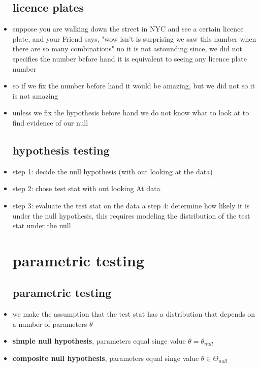 \documentclass{article}
\begin{document}
\begin{itemize}
\subsection{licence plates}
\item suppose you are walking down the street in NYC and see a certain licence plate, and your Friend says, "wow isn't is surprising we saw this number when there are so many combinations" no it is not astounding since, we did not specifies the number before hand it is equivalent to seeing any licence plate number
\item so if we fix the number before hand it would be amazing, but we did not so it is not amazing 
\item unless we fix the hypothesis before hand we do not know what to look at to find evidence of our null
\subsection{hypothesis testing}
\item step 1: decide the null hypothesis (with out looking at the data)
\item step 2: chose test stat with out looking At data 
\item step 3: evaluate the test stat on the data a
\tem step 4: determine how likely it is under the null hypothesis, this requires modeling the distribution of the test stat under the null 
\section{parametric testing}
\subsection{parametric testing}
\item we make the assumption that the test stat has a distribution that depends on a number of parameters $\theta$
\item \textbf{simple null hypothesis}, parameters equal singe value $\theta= \theta_{null}$
\item \textbf{composite null hypothesis}, parameters equal singe value $\theta\in \Theta_{null}$

\end{itemize}
\end{document}
